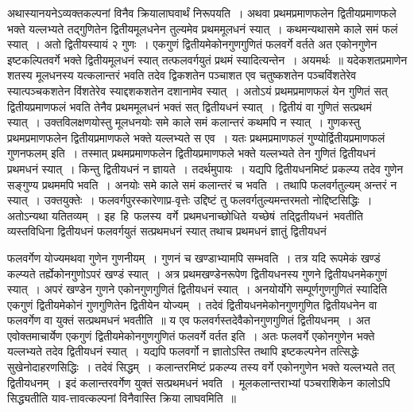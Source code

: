 \documentclass[11pt, openany]{book}
\begin{document}
 \vspace{-3mm}
 अथास्यानयनेऽव्यक्तकल्पनां विनैव क्रियालाघवार्थं निरूपयति~। अथवा 
प्रथमप्रमाणफलेन द्वितीयप्रमाणफले भक्ते यल्लभ्यते तद्गुणितेन द्वितीयमूलधनेन 
तुल्यमेव प्रथममूलधनं स्यात्~। कथमन्यथासमे काले समं फलं स्यात्~। 
अतो द्वितीयस्यायं २ गुणः~। एकगुणं द्वितीयमेकोनगुणगुणितं फलवर्गे वर्तते
अत एकोनगुणेन इष्टकल्पितवर्गे भक्ते द्वितीयमूलधनं स्यात् तत्फलवर्गयुतं
प्रथमं स्यादित्यन्तेन~। अयमर्थः~॥ यदेकशतप्रमाणेन शतस्य मूलधनस्य यत्कलान्तरं भवति तदेव द्विकशतेन पञ्चाशत एव चतुष्कशतेन पञ्चविंशतेरेव स्यात्पञ्चकशतेन विंशतेरेव स्याद्दशकशतेन दशानामेव स्यात्~। अतोऽयं प्रथमप्रमाणफलं येन गुणितं सत् द्वितीयप्रमाणफलं भवति तेनैव प्रथममूलधनं भक्तं सत् द्वितीयधनं स्यात्~। द्वितीयं वा गुणितं सत्प्रथमं स्यात्~। उक्तविलक्षणयोस्तु मूलधनयोः समे काले समं कलान्तरं कथमपि न स्यात्~। गुणकस्तु प्रथमप्रमाणफलेन द्वितीयप्रमाणफले भक्ते यल्लभ्यते स एव~। यतः प्रथमप्रमाणफलं गुण्योर्द्वितीयप्रमाणफलं गुणनफलम् इति~। तस्मात् प्रथमप्रमाणफलेन द्वितीयप्रमाणफले भक्ते यल्लभ्यते तेन गुणितं द्वितीयधनं प्रथमधनं स्यात्~। किन्तु द्वितीयधनं न ज्ञायते~। तदर्थमुपायः~। यद्यपि द्वितीयधनमिष्टं प्रकल्प्य तदेव गुणेन सङ्गुण्य प्रथममपि भवति~। अनयोः समे काले समं कलान्तरं च भवति~। तथापि फलवर्गतुल्यम् अन्तरं न स्यात्~। उक्तयुक्तेः~। फलवर्गपुरस्कारेणाप्र-वृत्तेः उद्दिष्टं तु फलवर्गतुल्यमन्तरमतो नोद्दिष्टसिद्धिः~। अतोऽन्यथा यतितव्यम्~। इह \,हि \,फलस्य \,वर्गे \,प्रथमधनाच्छोधिते \,यच्छेषं \,तद्द्वितीयधनं \,भवतीति \,व्यस्तविधिना द्वितीयधनं फलवर्गयुतं सत्प्रथमधनं स्यात् तथाच प्रथमधनं ज्ञातुं द्वितीयधनं
\newpage

\noindent फलवर्गेण योज्यमथवा गुणेन गुणनीयम्~। गुणनं च खण्डाभ्यामपि सम्भवति~। तत्र यदि रूपमेकं खण्डं कल्प्यते तर्ह्येकोनगुणोऽपरं खण्डं स्यात्~। अत्र प्रथमखण्डेनरूपेण द्वितीयधनस्य गुणने द्वितीयधनमेकगुणं स्यात्~। अपरं 
खण्डेन गुणने एकोनगुणगुणितं द्वितीयधनं स्यात्~। अनयोर्योगे
सम्पूर्णगुणगुणितं स्यादिति एकगुणं द्वितीयमेकोनं गुणगुणितेन द्वितीयेन योज्यम्~। तदेवं
द्वितीयधनमेकोनगुणगुणित द्वितीयधनेन वा फलवर्गेण वा युक्तं सत्प्रथमधनं भवतीति~॥ य एव फलवर्गस्तदेवैकोनगुणगुणितं द्वितीयधनम्~। अत एवोक्तमाचार्येण एकगुणं द्वितीयमेकोनगुणगुणितं फलवर्गे वर्तत इति~। अतः 
फलवर्गे एकोनगुणेन भक्ते यल्लभ्यते तदेव द्वितीयधनं स्यात्~। यद्यपि 
फलवर्गो न ज्ञातोऽस्ति तथापि इष्टकल्पनेन तत्सिद्धेः सुखेनोदाहरणसिद्धिः~।
तदेवं सिद्धम्~। कलान्तरमिष्टं प्रकल्प्य तस्य वर्गे एकोनगुणेन भक्ते यल्लभ्यते तत् द्वितीयधनम्~। इदं कलान्तरवर्गेण युक्तं सत्प्रथमधनं भवति~। 
मूलकलान्तराभ्यां पञ्चराशिकेन कालोऽपि सिद्ध्यतीति याव-त्तावत्कल्पनां विनैवास्ति क्रिया लाघवमिति~॥~\\
\end{document}
